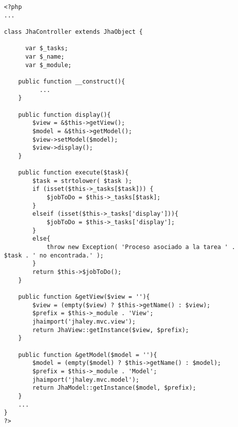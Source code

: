 \begin{lstlisting}[label=jha_controller,caption=JhaController.]
<?php 
...

class JhaController extends JhaObject {
	
	  var $_tasks;
	  var $_name;
	  var $_module;
	
    public function __construct(){
    	  ...
    }
    
    public function display(){
      	$view = &$this->getView();
      	$model = &$this->getModel();
      	$view->setModel($model);
      	$view->display();
    }
    
    public function execute($task){
        $task = strtolower( $task );
        if (isset($this->_tasks[$task])) {
        	$jobToDo = $this->_tasks[$task];
        }
        elseif (isset($this->_tasks['display'])){
        	$jobToDo = $this->_tasks['display'];
        }
        else{
        	throw new Exception( 'Proceso asociado a la tarea ' . $task . ' no encontrada.' );
        }
        return $this->$jobToDo();
    }
    
    public function &getView($view = ''){
    	$view = (empty($view) ? $this->getName() : $view);
        $prefix = $this->_module . 'View';
        jhaimport('jhaley.mvc.view');
        return JhaView::getInstance($view, $prefix);
    }
    
    public function &getModel($model = ''){
    	$model = (empty($model) ? $this->getName() : $model);
        $prefix = $this->_module . 'Model';
        jhaimport('jhaley.mvc.model');
        return JhaModel::getInstance($model, $prefix);
    }
    ...
}
?>
\end{lstlisting}
